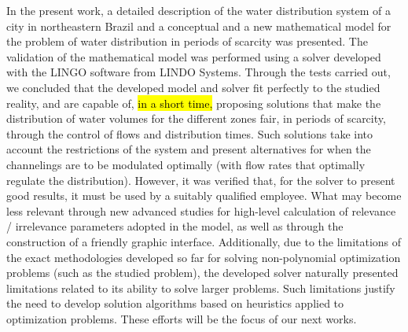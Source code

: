 \documentclass{singlecol}
\theoremstyle{TH}{
\newtheorem{lemma}{Lemma}
\newtheorem{theorem}[lemma]{Theorem}
\newtheorem{corrolary}[lemma]{Corrolary}
\newtheorem{conjecture}[lemma]{Conjecture}
\newtheorem{proposition}[lemma]{Proposition}
\newtheorem{claim}[lemma]{Claim}
\newtheorem{stheorem}[lemma]{Wrong Theorem}
\newtheorem{algorithm}{Algorithm}
}
\theoremstyle{THrm}{
\newtheorem{definition}{Definition}[section]
\newtheorem{question}{Question}[section]
\newtheorem{remark}{Remark}
\newtheorem{scheme}{Scheme}
}
\theoremstyle{THhit}{
\newtheorem{case}{Case}[section]
}
\begin{document}
In the present work, a detailed description of the water distribution system of a city in northeastern Brazil and a conceptual and a new mathematical model for the problem of water distribution in periods of scarcity was presented. The validation of the mathematical model was performed using a solver developed with the LINGO software from LINDO Systems. Through the tests carried out, we concluded that the developed model and solver fit perfectly to the studied reality, and are capable of, \hl{in a short time,} proposing solutions that make the distribution of water volumes for the different zones fair, in periods of scarcity, through the control of flows and distribution times. Such solutions take into account the restrictions of the system and present alternatives for when the channelings are to be modulated optimally (with flow rates that optimally regulate the distribution). However, it was verified that, for the solver to present good results, it must be used by a suitably qualified employee. What may become less relevant through new advanced studies for high-level calculation of relevance / irrelevance parameters adopted in the model, as well as through the construction of a friendly graphic interface.  Additionally, due to the limitations of the exact methodologies developed so far for solving non-polynomial optimization problems (such as the studied problem), the developed solver naturally presented limitations related to its ability to solve larger problems. Such limitations justify the need to develop solution algorithms based on heuristics applied to optimization problems. These efforts will be the focus of our next works.


\end{document}
